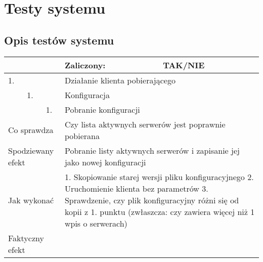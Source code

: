 \chapter{Testy systemu}
\label{ap:2}

\section{Opis testów systemu}

\begin{tabular}{|p{20pt}|p{20pt}|p{20pt}|p{250pt}|p{60pt}|}
	\hline
	\multicolumn{3}{|p{70pt}|}{} & Zaliczony: & TAK/NIE \\ \hline
	1. & & & \multicolumn{2}{|p{310pt}|}{Działanie klienta pobierającego } \\ \hline
	& 1. & & \multicolumn{2}{|p{310pt}|}{Konfiguracja } \\ \hline
	& & 1. & \multicolumn{2}{|p{310pt}|}{Pobranie konfiguracji } \\ \hline
	\multicolumn{3}{|p{70pt}|}{Co sprawdza} & \multicolumn{2}{|p{310pt}|}{Czy lista aktywnych serwerów jest poprawnie pobierana} \\ \hline
	\multicolumn{3}{|p{70pt}|}{Spodziewany efekt} & \multicolumn{2}{|p{310pt}|}{Pobranie listy aktywnych serwerów i zapisanie jej jako nowej konfiguracji} \\ \hline
	\multicolumn{3}{|p{70pt}|}{Jak wykonać} & \multicolumn{2}{|p{310pt}|}{1. Skopiowanie starej wersji pliku konfiguracyjnego 
2. Uruchomienie klienta bez parametrów
3. Sprawdzenie, czy plik konfiguracyjny różni się od kopii z 1. punktu (zwłaszcza: czy zawiera więcej niż 1 wpis o serwerach)} \\ \hline
	\multicolumn{3}{|p{70pt}|}{Faktyczny efekt} & \multicolumn{2}{|p{310pt}|}{} \\ \hline
\end{tabular}

